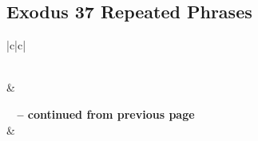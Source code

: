 \subsection{Exodus 37 Repeated Phrases}


\normalsize
 
\begin{center}
\begin{longtable}{|c|c|}
\caption[Exodus 37 Repeated Phrases]{Exodus 37 Repeated Phrases}\label{table:Repeated Phrases Exodus 37} \\
\hline {} &  \\ \hline 
\endfirsthead
 
{{\bfseries \tablename\ \thetable{} -- continued from previous page}} \\  
\hline {} &  \\ \hline 
\endhead
 

\end{longtable}
\end{center}
